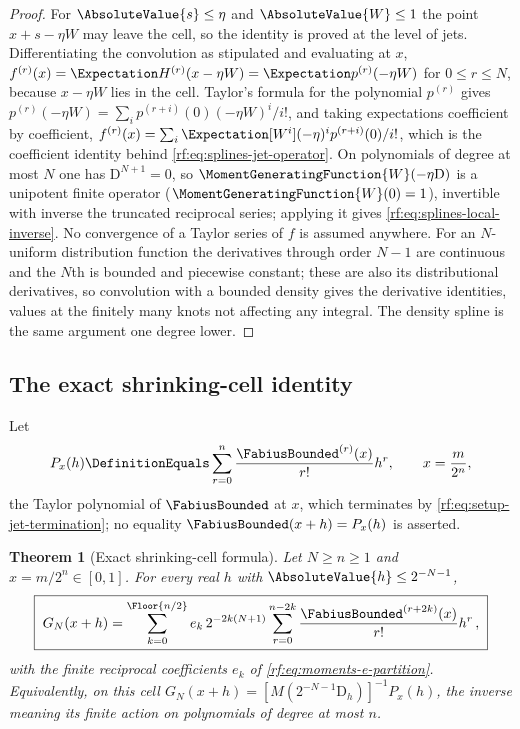 \documentclass[11pt,oneside]{article}
\theoremstyle{plain}
\newtheorem{theorem}{Theorem}[section]
\theoremstyle{definition}
\theoremstyle{remark}
\newcommand{\Fb}{\FabiusBounded}            %
\newcommand{\E}{\Expectation}
\newcommand{\Dop}{\mathrm{D}}               %
\begin{document}
\begin{proof}
For $\AbsoluteValue{s}\le\eta$ and $\AbsoluteValue{W}\le1$ the point
$x+s-\eta W$ may leave the cell, so the identity is proved at the level of
jets.  Differentiating the convolution as stipulated and evaluating at $x$,
$f^{(r)}(x)=\E H^{(r)}(x-\eta W)=\E p^{(r)}(-\eta W)$ for $0\le r\le N$,
because $x-\eta W$ lies in the cell.  Taylor's formula for the polynomial
$p^{(r)}$ gives $p^{(r)}(-\eta W)=\sum_{i}p^{(r+i)}(0)(-\eta W)^{i}/i!$, and
taking expectations coefficient by coefficient,
$f^{(r)}(x)=\sum_{i}\E[W^{i}](-\eta)^{i}p^{(r+i)}(0)/i!$, which is the
coefficient identity behind \cref{rf:eq:splines-jet-operator}.  On
polynomials of degree at most $N$ one has $\Dop^{N+1}=0$, so
$\MomentGeneratingFunction{W}(-\eta\Dop)$ is a unipotent finite operator
($\MomentGeneratingFunction{W}(0)=1$), invertible with inverse the truncated
reciprocal series; applying it gives \cref{rf:eq:splines-local-inverse}.  No
convergence of a Taylor series of $f$ is assumed anywhere.  For an
$N$-uniform distribution function the derivatives through order $N-1$ are
continuous and the $N$th is bounded and piecewise constant; these are also
its distributional derivatives, so convolution with a bounded density gives
the derivative identities, values at the finitely many knots not affecting
any integral.  The density spline is the same argument one degree lower.
\end{proof}

\subsection{The exact shrinking-cell identity}
\label{rf:sec:splines-cell}

Let
\begin{equation}
 P_{x}(h)\DefinitionEquals\sum_{r=0}^{n}\frac{\Fb^{(r)}(x)}{r!}h^{r},\qquad x=\frac{m}{2^{n}},
 \label{rf:eq:splines-taylor}
\end{equation}
the Taylor polynomial of $\Fb$ at $x$, which terminates by
\cref{rf:eq:setup-jet-termination}; no equality $\Fb(x+h)=P_{x}(h)$ is
asserted.

\begin{theorem}[Exact shrinking-cell formula]
\label{rf:thm:local-cell}
Let $N\ge n\ge1$ and $x=m/2^{n}\in[0,1]$.  For every real $h$ with
$\AbsoluteValue{h}\le2^{-N-1}$,
\begin{equation}
 \boxed{\;
 G_{N}(x+h)=\sum_{k=0}^{\Floor{n/2}}e_{k}\,2^{-2k(N+1)}
 \sum_{r=0}^{n-2k}\frac{\Fb^{(r+2k)}(x)}{r!}h^{r}\,,\;}
 \label{rf:eq:local-cell}
\end{equation}
with the finite reciprocal coefficients $e_{k}$ of
\cref{rf:eq:moments-e-partition}.  Equivalently, on this cell
$G_{N}(x+h)=[M(2^{-N-1}\Dop_{h})]^{-1}P_{x}(h)$, the inverse meaning its
finite action on polynomials of degree at most $n$.
\end{theorem}
\end{document}
